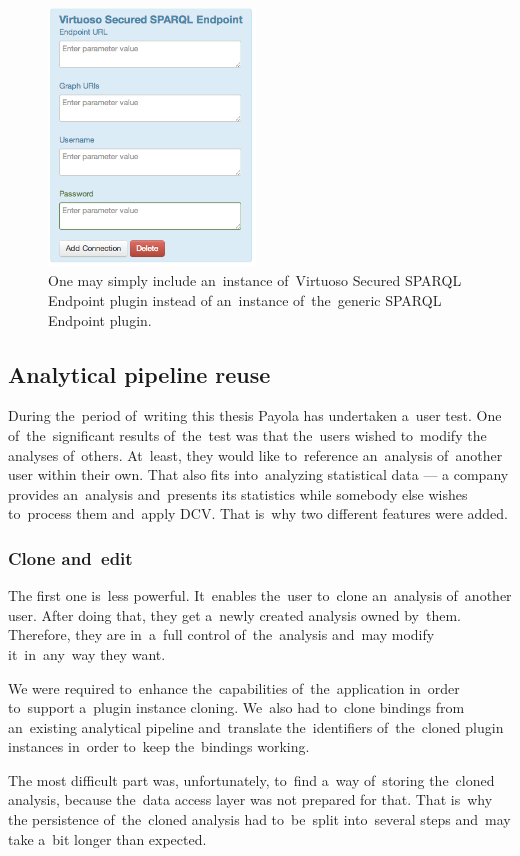 \begin{figure}
	\centering
	\includegraphics[width=55mm]{img/secured.png}
	\caption{One may simply include an~instance of~Virtuoso Secured SPARQL Endpoint plugin instead
	of an~instance of~the~generic SPARQL Endpoint plugin.}
	\label{fig:secured-ds}
\end{figure}

\subsection{Analytical pipeline reuse}
During the~period of~writing this thesis Payola has undertaken a~user test. One 
of~the~significant results of~the~test was that the~users wished to~modify the
analyses of~others. At~least, they would like to~reference an~analysis of~another user within their own. That also fits into~analyzing statistical data --- 
a company provides an~analysis and~presents its statistics while somebody else 
wishes to~process them and~apply DCV. That is~why two different features 
were added.

\subsubsection{Clone and~edit}
The first one is~less powerful. It~enables the~user to~clone an~analysis of~another user. After doing that, they get a~newly created analysis owned by~them. Therefore, they are in~a~full control of~the~analysis and~may modify it~in~any~way they want.

We were required to~enhance the~capabilities of~the~application in~order to~support a~plugin instance cloning.
We~also had to~clone bindings from an~existing analytical pipeline and~translate the~identifiers of~the~cloned plugin 
instances in~order to~keep the~bindings working.

The most difficult part was, unfortunately, to~find a~way of~storing the~cloned 
analysis, because the~data access layer was not prepared for that. That is~why
the persistence of~the~cloned analysis had to~be~split into~several steps and~may take a~bit longer than expected.

